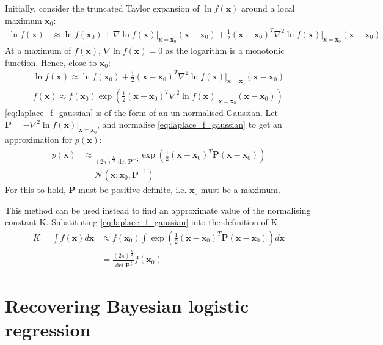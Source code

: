 \documentclass[a4paper]{article}
\begin{document}
    Initially, consider the truncated Taylor expansion of $\ln f(\bm{x})$ around a local maximum $\bm{x}_0$:
    \begin{align}
        \ln f(\bm{x}) &\approx \ln f(\bm{x}_0) + \nabla \ln f(\bm{x}) \big|_{\bm{x} = \bm{x}_0} (\bm{x} - \bm{x}_0)
        + \frac{1}{2} (\bm{x} - \bm{x}_0)^T \nabla^2 \ln f(\bm{x}) \big|_{\bm{x} = \bm{x}_0} (\bm{x} - \bm{x}_0)
    \end{align}
    At a maximum of $f(\bm{x})$, $\nabla \ln f(\bm{x}) = 0$ as the logarithm is a monotonic function. Hence, close to $\bm{x}_0$:
    \begin{align}
        \ln f(\bm{x}) \approx \ln f(\bm{x}_0) + \frac{1}{2} (\bm{x} - \bm{x}_0)^T \nabla^2 \ln f(\bm{x}) \big|_{\bm{x} = \bm{x}_0} (\bm{x} - \bm{x}_0) \nonumber \\
        f(\bm{x}) \approx f(\bm{x}_0) \exp \left(\frac{1}{2} (\bm{x} - \bm{x}_0)^T \nabla^2 \ln f(\bm{x}) \big|_{\bm{x} = \bm{x}_0} (\bm{x} - \bm{x}_0) \right)
        \label{eq:laplace_f_gaussian}
    \end{align}
    \autoref{eq:laplace_f_gaussian} is of the form of an un-normalised Gaussian. Let $\bm{P} = -\nabla^2 \ln f(\bm{x})\big|_{\bm{x} = \bm{x}_0}$,
    and normalise \autoref{eq:laplace_f_gaussian} to get an approximation for $p(\bm{x})$:
    \begin{align}
        p(\bm{x}) &\approx \frac{1}{(2\pi)^\frac{M}{2} \det\bm{P}^{-\frac{1}{2}}} \exp \left(\frac{1}{2} (\bm{x} - \bm{x}_0)^T \bm{P} (\bm{x} - \bm{x}_0) \right) \nonumber \\
        &= \mathcal{N}(\bm{x}; \bm{x}_0, \bm{P}^{-1})
        \label{eq:laplace_approximation}
    \end{align}
    For this to hold, $\bm{P}$ must be positive definite, i.e. $\bm{x}_0$ must be a maximum.

    This method can be used instead to find an approximate value of the normalising constant K. Substituting
    \autoref{eq:laplace_f_gaussian} into the definition of K:
    \begin{align}
        K = \int f(\bm{x}) d\bm{x} &\approx f(\bm{x}_0) \int \exp \left(\frac{1}{2} (\bm{x} - \bm{x}_0)^T \bm{P} (\bm{x} - \bm{x}_0) \right) d\bm{x} \nonumber \\
        &= \frac{(2\pi)^\frac{N}{2}}{\det \bm{P}^\frac{1}{2}} f(\bm{x}_0)
        \label{eq:normalising_constant}
    \end{align}

    \section{Recovering Bayesian logistic regression}
\end{document}
